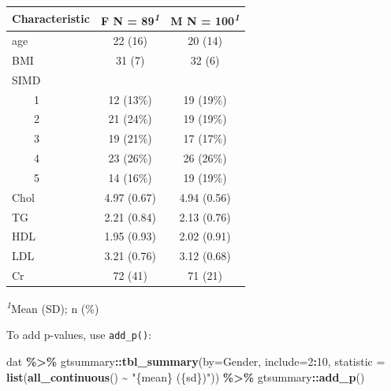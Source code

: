 \documentclass[
]{book}
\newenvironment{Shaded}{\begin{snugshade}}{\end{snugshade}}
\newcommand{\AttributeTok}[1]{\textcolor[rgb]{0.13,0.29,0.53}{#1}}
\newcommand{\DecValTok}[1]{\textcolor[rgb]{0.00,0.00,0.81}{#1}}
\newcommand{\FunctionTok}[1]{\textcolor[rgb]{0.13,0.29,0.53}{\textbf{#1}}}
\newcommand{\NormalTok}[1]{#1}
\newcommand{\SpecialCharTok}[1]{\textcolor[rgb]{0.81,0.36,0.00}{\textbf{#1}}}
\newcommand{\StringTok}[1]{\textcolor[rgb]{0.31,0.60,0.02}{#1}}
\begin{document}
\begin{table}[t]
\fontsize{12.0pt}{14.0pt}\selectfont
\begin{tabular*}{\linewidth}{@{\extracolsep{\fill}}lcc}
\toprule
\textbf{Characteristic} & \textbf{F}  N = 89\textsuperscript{\textit{1}} & \textbf{M}  N = 100\textsuperscript{\textit{1}} \\ 
\midrule\addlinespace[2.5pt]
age & 22 (16) & 20 (14) \\ 
BMI & 31 (7) & 32 (6) \\ 
SIMD &  &  \\ 
    1 & 12 (13\%) & 19 (19\%) \\ 
    2 & 21 (24\%) & 19 (19\%) \\ 
    3 & 19 (21\%) & 17 (17\%) \\ 
    4 & 23 (26\%) & 26 (26\%) \\ 
    5 & 14 (16\%) & 19 (19\%) \\ 
Chol & 4.97 (0.67) & 4.94 (0.56) \\ 
TG & 2.21 (0.84) & 2.13 (0.76) \\ 
HDL & 1.95 (0.93) & 2.02 (0.91) \\ 
LDL & 3.21 (0.76) & 3.12 (0.68) \\ 
Cr & 72 (41) & 71 (21) \\ 
\bottomrule
\end{tabular*}
\begin{minipage}{\linewidth}
\vspace{.05em}
\textsuperscript{\textit{1}}Mean (SD); n (\%)\\
\end{minipage}
\end{table}

To add p-values, use \texttt{add\_p()}:

\begin{Shaded}
\begin{Highlighting}[]
\NormalTok{dat }\SpecialCharTok{\%\textgreater{}\%}
\NormalTok{  gtsummary}\SpecialCharTok{::}\FunctionTok{tbl\_summary}\NormalTok{(}\AttributeTok{by=}\NormalTok{Gender, }\AttributeTok{include=}\DecValTok{2}\SpecialCharTok{:}\DecValTok{10}\NormalTok{, }
              \AttributeTok{statistic =} \FunctionTok{list}\NormalTok{(}\FunctionTok{all\_continuous}\NormalTok{() }\SpecialCharTok{\textasciitilde{}} \StringTok{"\{mean\} (\{sd\})"}\NormalTok{)) }\SpecialCharTok{\%\textgreater{}\%}
\NormalTok{  gtsummary}\SpecialCharTok{::}\FunctionTok{add\_p}\NormalTok{()}
\end{Highlighting}
\end{Shaded}
\end{document}
